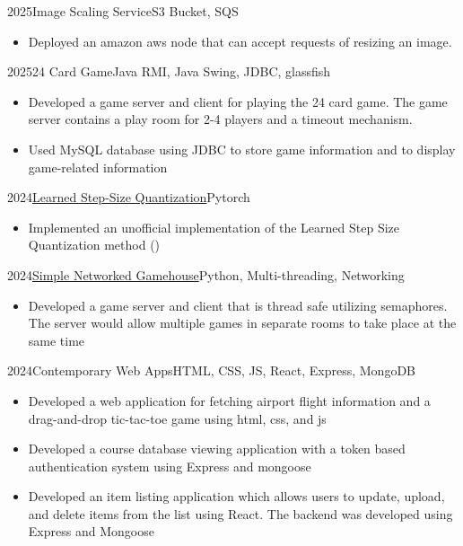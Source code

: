\documentclass{cv}
\begin{document}
	\begin{project}{2025}{Image Scaling Service}{S3 Bucket, SQS}
        \begin{itemize}
            \item Deployed an amazon aws node that can accept requests of resizing an image.
        \end{itemize}
	\end{project}

    \begin{project}{2025}{24 Card Game}{Java RMI, Java Swing, JDBC, glassfish}
        \begin{itemize}
    	    \item Developed a game server and client for playing the 24 card game. The game server contains a play room for 2-4 players and a timeout mechanism.
            \item Used MySQL database using JDBC to store game information and to display game-related information
        \end{itemize}
	\end{project}

    \begin{project}{2024}{\href{https://github.com/Nepranal/Learned-Step-Size-Quantization}{Learned Step-Size Quantization}}{Pytorch}
        \begin{itemize}
    	    \item Implemented an unofficial implementation of the Learned Step Size Quantization method ()
        \end{itemize}
	\end{project}

    \begin{project}{2024}{\href{https://github.com/Nepranal/simple-gamehouse}{Simple Networked Gamehouse}}{Python, Multi-threading, Networking}
        \begin{itemize}
    	    \item Developed a game server and client that is thread safe utilizing semaphores. The server would allow multiple games in separate rooms to take place at the same time
        \end{itemize}
	\end{project}

    \begin{project}{2024}{Contemporary Web Apps}{HTML, CSS, JS, React, Express, MongoDB}
        \begin{itemize}
    	    \item Developed a web application for fetching airport flight information and a drag-and-drop tic-tac-toe game using html, css, and js
            \item Developed a course database viewing application with a token based authentication system using Express and mongoose
            \item Developed an item listing application which allows users to update, upload, and delete items from the list using React. The backend was developed using Express and Mongoose
        \end{itemize}
	\end{project}
\end{document}

